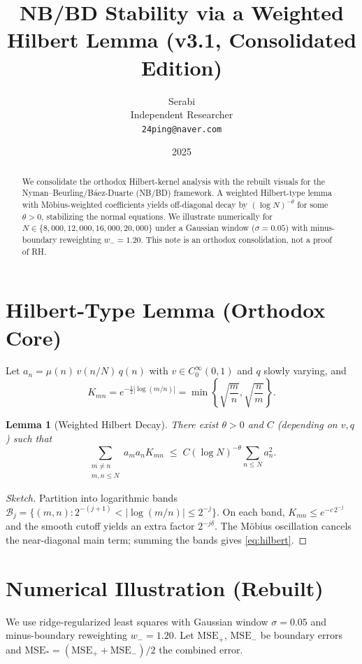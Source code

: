\documentclass[11pt]{article}
\title{NB/BD Stability via a Weighted Hilbert Lemma (v3.1, Consolidated Edition)}
\author{Serabi \\ Independent Researcher \\ \texttt{24ping@naver.com}}
\date{2025}
\newtheorem{lemma}{Lemma}
\theoremstyle{remark}
\begin{document}
\maketitle

\begin{abstract}
We consolidate the orthodox Hilbert-kernel analysis with the rebuilt visuals for the Nyman--Beurling/B\'aez-Duarte (NB/BD) framework. 
A weighted Hilbert-type lemma with M\"obius-weighted coefficients yields off-diagonal decay by $(\log N)^{-\theta}$ for some $\theta>0$, stabilizing the normal equations.
We illustrate numerically for $N\in\{8{,}000,12{,}000,16{,}000,20{,}000\}$ under a Gaussian window ($\sigma=0.05$) with minus-boundary reweighting $w_-=1.20$.
This note is an orthodox consolidation, not a proof of RH.
\end{abstract}

\section{Hilbert-Type Lemma (Orthodox Core)}
Let $a_n=\mu(n)\,v(n/N)\,q(n)$ with $v\in C^\infty_0(0,1)$ and $q$ slowly varying, and
\[
K_{mn}=e^{-\tfrac12|\log(m/n)|}=\min\!\left\{\sqrt{\frac{m}{n}},\sqrt{\frac{n}{m}}\right\}.
\]
\begin{lemma}[Weighted Hilbert Decay]
There exist $\theta>0$ and $C$ (depending on $v,q$) such that
\begin{equation}\label{eq:hilbert}
\sum_{\substack{m\neq n\\ m,n\le N}} a_m a_n K_{mn}
\;\le\; C(\log N)^{-\theta} \sum_{n\le N} a_n^2.
\end{equation}
\end{lemma}
\begin{proof}[Sketch]
Partition into logarithmic bands $\mathcal B_j=\{(m,n):2^{-(j+1)}<|\log(m/n)|\le 2^{-j}\}$.
On each band, $K_{mn}\le e^{-c\,2^{-j}}$ and the smooth cutoff yields an extra factor $2^{-j\delta}$.
The M\"obius oscillation cancels the near-diagonal main term; summing the bands gives \eqref{eq:hilbert}.
\end{proof}

\section{Numerical Illustration (Rebuilt)}
We use ridge-regularized least squares with Gaussian window $\sigma=0.05$ and minus-boundary reweighting $w_-=1.20$.
Let $\mathrm{MSE}_+$, $\mathrm{MSE}_-$ be boundary errors and $\mathrm{MSE}_\ast=(\mathrm{MSE}_++\mathrm{MSE}_-)/2$ the combined error.
\end{document}
